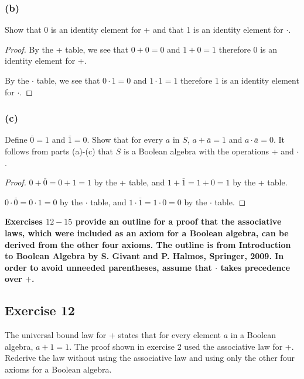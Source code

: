 \documentclass[14pt]{extarticle}
\newcommand{\cy}{\color{cyan}}
\begin{document}
\subsubsection{(b)}
Show that 0 is an identity element for + and that 1 is an identity element for $\cdot$.

\begin{proof}
By the + table, we see that $0 + 0 = 0$ and $1 + 0 = 1$ therefore 0 is an identity element for +.

By the $\cdot$ table, we see that $0 \cdot 1 = 0$ and $1 \cdot 1 = 1$ therefore 1 is an identity element for $\cdot$.
\end{proof}

\subsubsection{(c)}
Define \(\bar{0} = 1\) and \(\bar{1} = 0\). Show that for every $a$ in $S$, \(a + \bar{a} = 1\) and 
\(a \cdot \bar{a} = 0\). It follows from parts (a)-(c) that $S$ is a Boolean algebra with the operations + and $\cdot$.

\begin{proof}
\(0 + \bar{0} = 0 + 1 = 1\) by the + table, and \(1 + \bar{1} = 1 + 0 = 1\) by the + table.

\(0 \cdot \bar{0} = 0 \cdot 1 = 0\) by the $\cdot$ table, and \(1 \cdot \bar{1} = 1 \cdot 0 = 0\) by the $\cdot$ table.
\end{proof}

{\bf \cy Exercises $12-15$ provide an outline for a proof that the associative laws, which were included as an axiom for a Boolean algebra, can be derived from the other four axioms. The outline is from Introduction to Boolean Algebra by S. Givant and P. Halmos, Springer, 2009. In order to avoid unneeded parentheses, assume that $\cdot$ takes precedence over $+$.}

\subsection{Exercise 12}
The universal bound law for + states that for every element $a$ in a Boolean algebra, \(a + 1 = 1\). The proof shown in 
exercise 2 used the associative law for +. Rederive the law without using the associative law and using only the other 
four axioms for a Boolean algebra.
\end{document}
